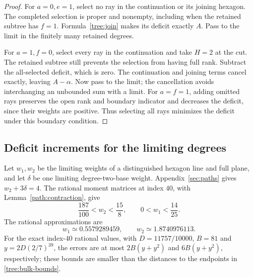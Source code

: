 \begin{proof}
For $a=0,e=1$, select no ray in the continuation or its joining
hexagon. The completed selection is proper and nonempty, including
when the retained subtree has $f=1$. Formula~\eqref{tree:join} makes
its deficit exactly $A$. Pass to the limit in the finitely many
retained degrees.

For $a=1,f=0$, select every ray in the continuation and take $H=2$
at the cut. The retained subtree still prevents the selection from
having full rank.
Subtract the all-selected deficit, which is zero. The continuation
and joining terms cancel exactly, leaving $A-\alpha$. Now pass to the
limit; the cancellation avoids interchanging an
unbounded sum with a limit.
For $a=f=1$, adding omitted rays preserves the open rank and boundary
indicator and decreases the deficit, since their weights are positive.
Thus selecting all rays minimizes the deficit under this boundary condition.
\end{proof}

\subsection{Deficit increments for the limiting degrees}
Let $w_1,w_2$ be the limiting weights of a distinguished hexagon line
and full plane, and let $\delta$ be one limiting degree-two-base weight.
Appendix~\ref{sec:paths} gives $w_2+3\delta=4$. The rational moment
matrices at index $40$, with Lemma~\ref{path:contraction}, give
\begin{equation}\label{tree:bulk-bounds}
 \frac{187}{100}<w_2<\frac{15}{8},\qquad 0<w_1<\frac{14}{25}.
\end{equation}
The rational approximations are
\[
 w_1\simeq0.5579289459,\qquad w_2\simeq1.8740976113.
\]
For the exact index-$40$ rational values, with $D=11757/10000$,
$B=81$ and $y=2D(2/7)^{39}$, the errors are
at most $2B(y+y^2)$ and $6B(y+y^2)$, respectively; these bounds
are smaller than the distances to the endpoints in
\eqref{tree:bulk-bounds}.

